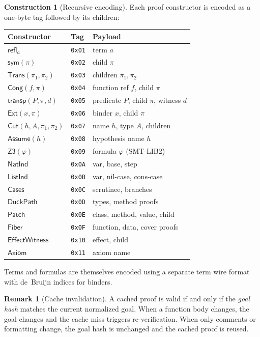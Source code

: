 \documentclass[11pt,a4paper]{report}
\theoremstyle{definition}
\newtheorem{remark}[definition]{Remark}
\newtheorem{construction}[definition]{Construction}
\theoremstyle{plain}
\newcommand{\transp}{\mathsf{transp}}
\newcommand{\Refl}{\mathsf{refl}}
\newcommand{\sym}{\mathsf{sym}}
\newcommand{\Ext}{\mathsf{Ext}}
\newcommand{\Cut}{\mathsf{Cut}}
\newcommand{\Assume}{\mathsf{Assume}}
\newcommand{\Trans}{\mathsf{Trans}}
\newcommand{\Cong}{\mathsf{Cong}}
\begin{document}
\begin{construction}[Recursive encoding]
Each proof constructor is encoded as a one-byte tag followed by its
children:
\begin{center}
\begin{tabular}{lll}
  \toprule
  \textbf{Constructor} & \textbf{Tag} & \textbf{Payload} \\
  \midrule
  $\Refl_a$ & \texttt{0x01} & term $a$ \\
  $\sym(\pi)$ & \texttt{0x02} & child $\pi$ \\
  $\Trans(\pi_1,\pi_2)$ & \texttt{0x03} & children $\pi_1, \pi_2$ \\
  $\Cong(f,\pi)$ & \texttt{0x04} & function ref $f$, child $\pi$ \\
  $\transp(P,\pi,d)$ & \texttt{0x05} & predicate $P$, child $\pi$, witness $d$ \\
  $\Ext(x,\pi)$ & \texttt{0x06} & binder $x$, child $\pi$ \\
  $\Cut(h,A,\pi_1,\pi_2)$ & \texttt{0x07} & name $h$, type $A$, children \\
  $\Assume(h)$ & \texttt{0x08} & hypothesis name $h$ \\
  $\mathsf{Z3}(\varphi)$ & \texttt{0x09} & formula $\varphi$ (SMT-LIB2) \\
  $\mathsf{NatInd}$ & \texttt{0x0A} & var, base, step \\
  $\mathsf{ListInd}$ & \texttt{0x0B} & var, nil-case, cons-case \\
  $\mathsf{Cases}$ & \texttt{0x0C} & scrutinee, branches \\
  $\mathsf{DuckPath}$ & \texttt{0x0D} & types, method proofs \\
  $\mathsf{Patch}$ & \texttt{0x0E} & class, method, value, child \\
  $\mathsf{Fiber}$ & \texttt{0x0F} & function, data, cover proofs \\
  $\mathsf{EffectWitness}$ & \texttt{0x10} & effect, child \\
  $\mathsf{Axiom}$ & \texttt{0x11} & axiom name \\
  \bottomrule
\end{tabular}
\end{center}
Terms and formulas are themselves encoded using a separate term wire
format with de~Bruijn indices for binders.
\end{construction}

\begin{remark}[Cache invalidation]
A cached proof is valid if and only if the \emph{goal hash} matches
the current normalized goal. When a function body changes, the
goal changes and the cache miss triggers re-verification. When only
comments or formatting change, the goal hash is unchanged and the
cached proof is reused.
\end{remark}
\end{document}
